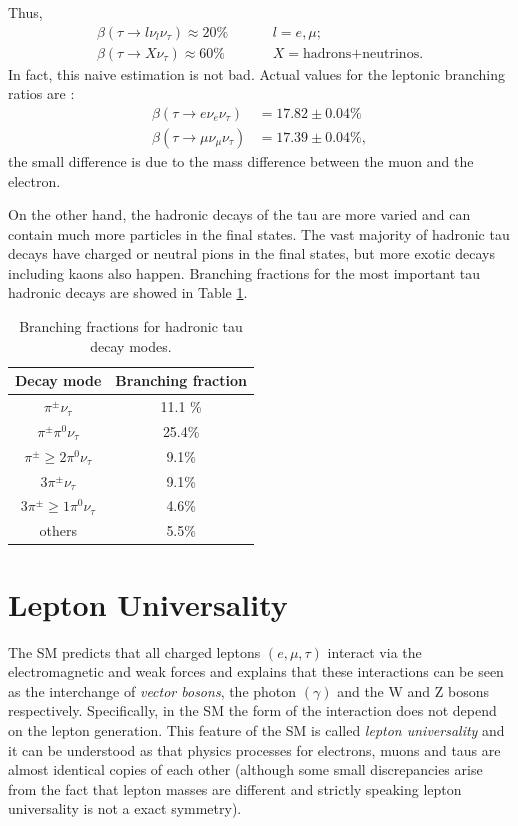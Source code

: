 Thus, 
\begin{align}
\beta(\tau\to l\nu_l\nu_\tau)\approx 20\%& \hspace{1cm}l=e,\mu;
\\
\beta(\tau\to X\nu_\tau)\approx 60\%& \hspace{1cm} X=\text{hadrons+neutrinos}.
\end{align}
In fact, this naive estimation is not bad. Actual values for the leptonic branching ratios are \cite{PhysRevD.98.030001}:
\begin{align}
\beta(\tau\to e\nu_e\nu_\tau)&=17.82\pm 0.04\%
\label{eq6}
\\
\beta(\tau\to \mu\nu_\mu\nu_\tau)&=17.39\pm 0.04\%,
\end{align}
the small difference is due to the mass difference between the muon and the electron.

On the other hand, the hadronic decays of the tau are more varied and can contain much more particles in the final states. The vast majority of hadronic tau decays have charged or neutral pions in the final states, but more exotic decays including kaons also happen. Branching fractions for the most important tau hadronic decays are showed in Table \ref{Table1}.
\begin{table}[]
	\centering
\begin{tabular}{|c|c|}
	\hline
	Decay mode                     & Branching fraction \\ \hline
	$\pi^\pm \nu_\tau$             & 11.1 \%            \\ \hline
	$\pi^\pm \pi^0 \nu_\tau$       & 25.4\%             \\ \hline
	$\pi^\pm \geq 2\pi^0 \nu_\tau$ & 9.1\%               \\ \hline
	$3\pi^\pm \nu_\tau$            & 9.1\%               \\ \hline
	$3\pi^\pm \geq 1\pi^0 \nu_\tau$& 4.6\%               \\ \hline
	others						   & 5.5\%               \\ \hline
\end{tabular}
	\caption{Branching fractions for hadronic tau decay modes.}
	\label{Table1}
\end{table}
\section{Lepton Universality}\label{chap2sec2}
The SM predicts that all charged leptons $(e,\mu,\tau)$ interact via the electromagnetic and weak forces and explains that these interactions can be seen as the interchange of \textit{vector bosons}, the photon $(\gamma)$ and the W and Z bosons respectively. Specifically, in the SM the form of the interaction does not depend on the lepton generation. This feature of the SM is called \textit{lepton universality} and it can be understood as that physics processes for electrons, muons and taus are almost identical copies of each other (although some small discrepancies arise from the fact that lepton masses are different and strictly speaking lepton universality is not a exact symmetry). 

